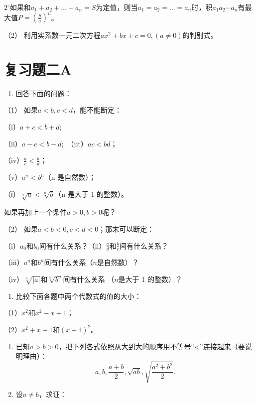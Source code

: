 \(2^{\circ}\)如果和\(a_{1} + a_{2} + \dots + a_{n} = S\)为定值，则当\(a_{1} = a_{2} = \dots = a_{n}\)时，积\(a_{1}a_{2}\cdots a_{n}\)有最大值\(P = \left(\frac{S}{a}\right)^{n}\)。

（2） 利用实系数一元二次方程\(ax^2 + bx + c = 0, (a \neq 0)\)的判别式。

\section{复习题二A}

\begin{enumerate}
\item
  回答下面的问题：
\end{enumerate}

（1） 如果\(a < b, c < d\)，能不能断定：

（i）\(a + c < b + d;\)

（ii）\(a - c < b - d;\) （jit）\(a c < b d\)；

（iv）\(\frac{a}{c} < \frac{b}{d}\)；

（v）\(a^n < b^n\)（n 是自然数）；

（ⅰ）\(\sqrt[n]{a} < \sqrt[n]{b}\)（n 是大于 1 的整数）。

如果再加上一个条件\(a > 0, b > 0\)呢？

（2） 如果\(a < b < 0, c < d < 0\)；那末可以断定：

（i）\(a_{0}\)和\(b_{0}\)间有什么关系？（ii）\(\frac{a}{d}\)和\(\frac{b}{c}\)间有什么关系？

（iii）\(a^n\)和\(b^n\)间有什么关系（\(n\)是自然数）？

（iv）\(\sqrt[n]{|a|}\)和\(\sqrt[n]{b^n}\)间有什么关系 （\(n\)是大于 1
的整数）？

\begin{enumerate}[start=2]
\item
  比较下面各题中两个代数式的值的大小：
\end{enumerate}

（1）\(x^{2}\)和\(x^{2} - x + 1\)；

（2）\(x^{2} + x + 1\)和\((x + 1)^{2}\)。

\begin{enumerate}[start=3]
\item
  已知\(a > b > 0\)，把下列各式依照从大到大的顺序用不等号``\textless''连接起来（要说明理由）：
\[
a, b, \frac{a + b}{2}, \sqrt{a b}, \sqrt{\frac{a^{2} + b^{2}}{2}}.
\]
\item
  设\(a \neq b\)，求证：
\end{enumerate}

